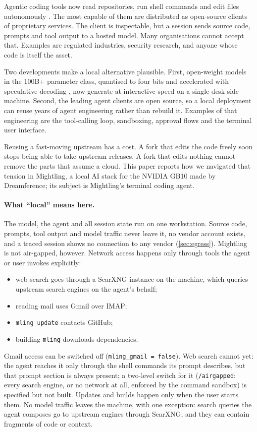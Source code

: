 \documentclass[11pt]{article}
\newcommand{\code}[1]{\texttt{#1}}
\begin{document}
Agentic coding tools now read repositories, run shell commands and edit files autonomously
\cite{yao2023react,yang2024sweagent,wang2024openhands}. The most capable of them are distributed as
open-source clients of proprietary services. The client is inspectable, but a session sends source
code, prompts and tool output to a hosted model. Many organisations cannot accept that. Examples
are regulated industries, security research, and anyone whose code is itself the asset.

Two developments make a local alternative plausible. First, open-weight models in the 100B+
parameter class, quantised to four bits \cite{cheng2023autoround} and accelerated with speculative
decoding \cite{leviathan2023speculative,chen2026dflash}, now generate at interactive speed on a
single desk-side machine. Second, the leading agent clients are open source, so a local deployment
can reuse years of agent engineering rather than rebuild it. Examples of that engineering are the
tool-calling loop, sandboxing, approval flows and the terminal user interface.

Reusing a fast-moving upstream has a cost. A fork that edits the code freely soon stops being able
to take upstream releases. A fork that edits nothing cannot remove the parts that assume a cloud.
This paper reports how we navigated that tension in Mightling, a local AI stack for the NVIDIA GB10
made by Dreamference; its subject is Mightling's terminal coding agent.

\paragraph{What ``local'' means here.} The model, the agent and all session state run on one
workstation. Source code, prompts, tool output and model traffic never leave it, no vendor
account exists, and a traced session shows no connection to any vendor
(\cref{sec:egress}). Mightling is not air-gapped, however. Network access happens only through tools the
agent or user invokes explicitly:
\begin{itemize}
  \item web search goes through a SearXNG \cite{searxng} instance on the machine, which queries
    upstream search engines on the agent's behalf;
  \item reading mail uses Gmail over IMAP;
  \item \code{mling update} contacts GitHub;
  \item building \code{mling} downloads dependencies.
\end{itemize}
Gmail access can be switched off (\code{mling\_gmail = false}). Web search cannot yet: the
agent reaches it only through the shell commands its prompt describes, but that prompt section is
always present; a two-level switch for it (\code{/airgapped}: every search engine, or no network
at all, enforced by the command sandbox) is specified but not built.
Updates and builds happen only when the user starts them. No model traffic leaves
the machine, with one exception: search queries the agent composes go to upstream engines through
SearXNG, and they can contain fragments of code or context.
\end{document}
